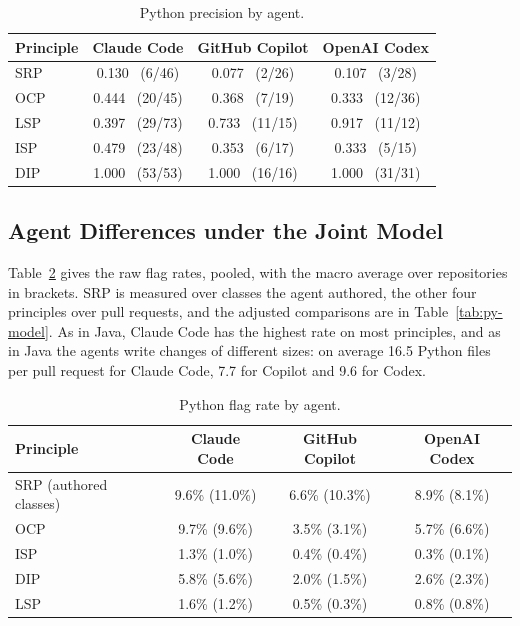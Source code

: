 \begin{table}[htb]
\centering
\caption{Python precision by agent.}
\label{tab:py-validation-agent}
\begin{tabular}{@{}lccc@{}}
\toprule
\textbf{Principle} & \textbf{Claude Code} & \textbf{GitHub Copilot} & \textbf{OpenAI Codex} \\
\midrule
SRP & 0.130 \ (6/46)  & 0.077 \ (2/26)  & 0.107 \ (3/28) \\
OCP & 0.444 \ (20/45) & 0.368 \ (7/19)  & 0.333 \ (12/36) \\
LSP & 0.397 \ (29/73) & 0.733 \ (11/15) & 0.917 \ (11/12) \\
ISP & 0.479 \ (23/48) & 0.353 \ (6/17)  & 0.333 \ (5/15) \\
DIP & 1.000 \ (53/53) & 1.000 \ (16/16) & 1.000 \ (31/31) \\
\bottomrule
\end{tabular}
\end{table}

\subsection{Agent Differences under the Joint Model}
\label{sec:python-agents}

Table~\ref{tab:py-agent-rates} gives the raw flag rates, pooled, with the macro average over
repositories in brackets. SRP is measured over classes the agent authored, the other four principles
over pull requests, and the adjusted comparisons are in Table~\ref{tab:py-model}. As in Java, Claude
Code has the highest rate
on most principles, and as in Java the agents write changes of different sizes: on average 16.5 Python
files per pull request for Claude Code, 7.7 for Copilot and 9.6 for Codex.

\begin{table}[htb]
\centering
\caption{Python flag rate by agent.}
\label{tab:py-agent-rates}
\begin{tabular}{@{}lccc@{}}
\toprule
\textbf{Principle} & \textbf{Claude Code} & \textbf{GitHub Copilot} & \textbf{OpenAI Codex} \\
\midrule
SRP (authored classes) & 9.6\% (11.0\%) & 6.6\% (10.3\%) & 8.9\% (8.1\%) \\
OCP & 9.7\% (9.6\%) & 3.5\% (3.1\%) & 5.7\% (6.6\%) \\
ISP & 1.3\% (1.0\%) & 0.4\% (0.4\%) & 0.3\% (0.1\%) \\
DIP & 5.8\% (5.6\%) & 2.0\% (1.5\%) & 2.6\% (2.3\%) \\
LSP & 1.6\% (1.2\%) & 0.5\% (0.3\%) & 0.8\% (0.8\%) \\
\bottomrule
\end{tabular}
\end{table}

